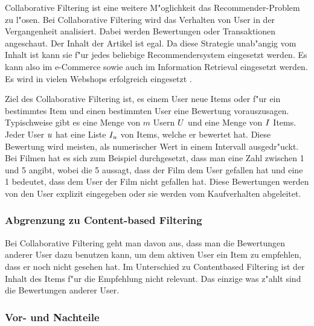 \documentclass[a4paper, 12pt]{article}
\begin{document}
Collaborative Filtering ist eine weitere M"oglichkeit das Re\-commender-Prob\-lem zu l"osen. Bei Collaborative Filtering wird das Verhalten von User in der Vergangenheit analisiert. Dabei werden Bewertungen oder Transaktionen angeschaut. Der Inhalt der Artikel ist egal. Da diese Strategie unab"angig vom Inhalt ist kann sie f"ur jedes beliebige Recommendersystem eingesetzt werden. Es kann also im e-Commerce sowie auch im Information Retrieval eingesetzt werden.  Es wird in vielen Webshops erfolgreich eingesetzt \cite{sarwar01}. 

Ziel des Collaborative Filtering ist, es einem User neue Items oder f"ur ein bestimmtes Item und einen bestimmten User eine Bewertung vorauszusagen. Typischweise gibt es eine Menge von $m$ Usern  $\mathnormal{U}$ und eine Menge von $ \mathnormal{I} $ Items. Jeder User $\mathnormal{u}$ hat eine Liste $\mathnormal{I_u}$ von Items, welche er bewertet hat. Diese Bewertung wird meisten, als numerischer Wert in einem Intervall ausgedr"uckt. Bei Filmen hat es sich zum Beispiel durchgesetzt, dass man eine Zahl zwischen 1 und 5 angibt, wobei die 5 aussagt, dass der Film dem User gefallen hat und eine 1 bedeutet, dass dem User der Film nicht gefallen hat. Diese Bewertungen werden von den User explizit eingegeben oder sie werden vom Kaufverhalten abgeleitet.

\subsubsection{Abgrenzung zu Content-based Filtering}
\label{sec:definitioncf}

Bei Collaborative Filtering geht man davon aus, dass man die Bewertungen anderer User dazu benutzen kann, um dem aktiven User ein Item zu empfehlen, dass er noch nicht gesehen hat. Im Unterschied zu Contentbased Filtering ist der Inhalt des Items f"ur die Empfehlung nicht relevant. Das einzige was z"ahlt sind die Bewertungen anderer User.

\subsubsection{Vor- und Nachteile}
\label{sec:advandage}
\end{document}

